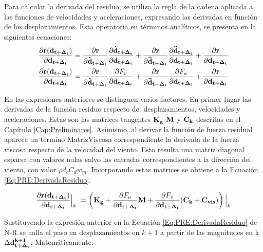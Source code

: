 Para calcular la derivada del residuo, se utiliza la regla de la cadena aplicada a las funciones de velocidades y aceleraciones, expresando las derivadas en función de los desplazamientos. Esta operatoria en términos analíticos, se presenta en la siguientes ecuaciones: 
\begin{equation}\label{Eq:MET:DerivadaResiduo}
	\begin{split}
	\frac{\partial  \bf{r}(\bf{d}_{t+\Delta_t})}{\partial
	\bf{d}_{t+\Delta_t}}&=\frac{\partial  \bf{r}}{\partial
	\bf{\dot{d}}_{t+\Delta_t}}\frac{\partial 
	\bf{\bf{\dot{d}}_{t+\Delta_t}}}{\partial \bf{{d}}_{t+\Delta_t}}+ \frac{\partial 
	\bf{r}}{\partial \bf{\ddot{d}}_{t+\Delta_t}}\frac{\partial 
	\bf{\bf{\ddot{d}}_{t+\Delta_t}}}{\partial \bf{{d}}_{t+\Delta_t}}+\frac{\partial 
	\bf{r}}{\partial \bf{{d}}_{t+\Delta_t}}\\
	\frac{\partial  \bf{r}(\bf{d}_{t+\Delta_t})}{\partial \bf{d}_{t+\Delta_t}}&= \frac{\partial  \bf{r}}{\partial\bf{\dot{d}}_{t+\Delta_t}}\frac{\partial F_v}{\partial \bf{{d}}_{t+\Delta_t}}+\frac{\partial  \bf{r}}{\partial\bf{\ddot{d}}_{t+\Delta_t}}\frac{\partial F_a}{\partial \bf{{d}}_{t+\Delta_t}}+\frac{\partial 
		\bf{r}}{\partial \bf{{d}}_{t+\Delta_t}}
	\end{split}
\end{equation}

En las expresiones anteriores se distinguen varios factores. En primer lugar las derivadas de la función residuo respecto de: desplazamientos, velocidades y aceleraciones. Estas son las matrices tangentes $\bf{K_g}$ $\bf{M}$ y $\bf{C_k}$ descritas en el Capítulo \ref{Cap:Preliminares}. Asimismo, al derivar la función de fuerza residual  aparece un termino \gls{MatrizViscosa} correspondiente la derivada de la fuerza viscosa respecto de la velocidad del viento. Esto resulta una matriz diagonal esparsa con valores nulas salvo las entradas correspondientes a la dirección del viento, con valor $\rho d_c C_d w_m$. Incorporando estas matrices se obtiene a la Ecuación \eqref{Eq:PRE:DerivadaResiduo}.

\begin{equation}\label{Eq:PRE:DerivadaResiduo}
	\frac{\partial  \bf{r}(\bf{d}_{t+\Delta_t})}{\partial \bf{d}_{t+\Delta_t}}\Big|_k~
	= \left (\bf{K}_g+\frac{\partial\text{$ F_a$}}{\partial \bf{{d}}_{t+\Delta_t}}\bf{M} + \frac{\partial\text{$ F_v$}}{\partial \bf{{d}}_{t+\Delta_t}}(\bf{C}_k+\bf{C}_{vis}) \right)\Big|_k
\end{equation}

Sustituyendo la expresión anterior en la Ecuación \eqref{Eq:PRE:DerivadaResiduo} de N-R se halla el paso en desplazamientos en $k+1$ a partir de las magnitudes en k $\Delta \bf{d}^{k+1}_{t+\Delta_t}$. Matemáticamente:




